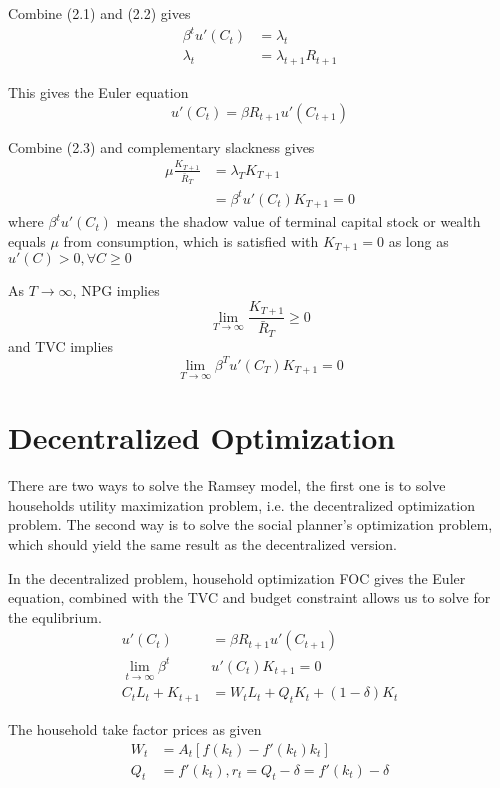 \documentclass[twocolumn, fleqn]{article}
\begin{document}
		Combine (2.1) and (2.2) gives
		\begin{align*}
			\beta^t u'(C_t) &= \lambda_t \\
			\lambda_t &= \lambda_{t+1} R_{t+1}
		\end{align*}

		This gives the Euler equation
		\[u'(C_t) = \beta R_{t+1} u'(C_{t+1}) \tag{Euler Equation}\]

		Combine (2.3) and complementary slackness gives
		\begin{align*}
			\mu \frac{K_{T+1}}{\bar{R}_T} &= \lambda_T K_{T+1}\\
			&= \beta^t u'(C_t)K_{T+1} = 0 \tag{Transversality}
		\end{align*}
		where $\beta^t u'(C_t)$ means the shadow value of terminal capital stock or wealth equals $\mu$ from
			consumption, which is satisfied with $K_{T+1}=0$ as long as $u'(C)>0, \forall C \geq 0$

		As $T \rightarrow \infty$, NPG implies \[\lim_{T\rightarrow \infty} \frac{K_{T+1}}{\bar{R}_T}\geq 0\]
			and TVC implies \[\lim_{T\rightarrow \infty} \beta^T u'(C_T)K_{T+1} = 0\]

	\section{Decentralized Optimization}\label{sec:decentralized-optimization}
		There are two ways to solve the Ramsey model, the first one is to solve households utility maximization
		problem, i.e. the decentralized optimization problem.
		The second way is to solve the social planner's optimization problem, which should yield the same result as
		the decentralized version.

		In the decentralized problem, household optimization FOC gives the Euler equation, combined with the TVC and
		budget constraint allows us to solve for the equlibrium.
		\begin{align}
			u'(C_t) &= \beta R_{t+1}u'(C_{t+1})\\
			\lim_{t \rightarrow \infty} \beta^t &u'(C_t)K_{t+1} = 0\\
			C_t L_t + K_{t+1} &= W_t L_t + Q_t K_t + (1-\delta)K_t
		\end{align}

		The household take factor prices as given
		\begin{align}
			W_t &= A_t [f(k_t)-f'(k_t)k_t]\\
			Q_t &= f'(k_t), r_t = Q_t -\delta=f'(k_t)-\delta
		\end{align}
\end{document}
